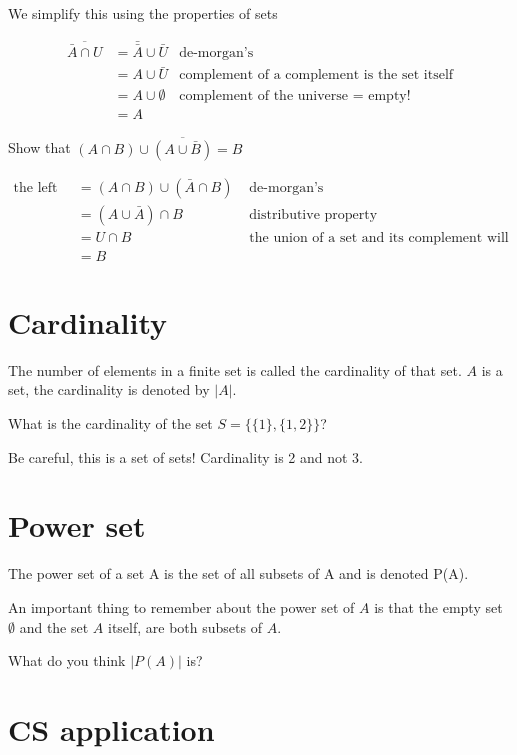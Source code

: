 \documentclass[12pt]{article}
\begin{document}
We simplify this using the properties of sets

\begin{align*}
\overline{\bar{A} \cap U} &= \bar{\bar{A}} \cup \bar{U} & \text{de-morgan's}\\
&= A \cup \bar{U} & \text{complement of a complement is the set itself}\\
&= A \cup \emptyset & \text{complement of the universe = empty!}\\
&= A
\end{align*}

Show that $(A \cap B) \cup \overline{(A \cup \bar{B})} = B$

\begin{align*}
\text{the left side} &= (A \cap B) \cup (\bar{A} \cap B)  & \text{      de-morgan's}\\
&= (A \cup \bar{A}) \cap B & \text{     distributive property}\\
&= U \cap B & \text{  the union of a set and its complement will be the universal set} \\
&= B 
\end{align*}

\section*{Cardinality}
The number of elements in a finite set is called the cardinality of that set.
$A$ is a set, the cardinality is denoted by $|A|$.

What is the cardinality of the set $S = \{\{1\},\{1,2\}\}$?

Be careful, this is a set of sets!  Cardinality is 2 and not 3.

\section*{Power set}

The power set of a set A is the set of all subsets of A and is denoted P(A).

An important thing to remember about the power set of $A$ is that the empty set $\emptyset$ and the set $A$ itself, are both subsets of $A$.

What do you think $|P(A)|$ is?

\pagebreak

\section*{CS application}
\end{document}

